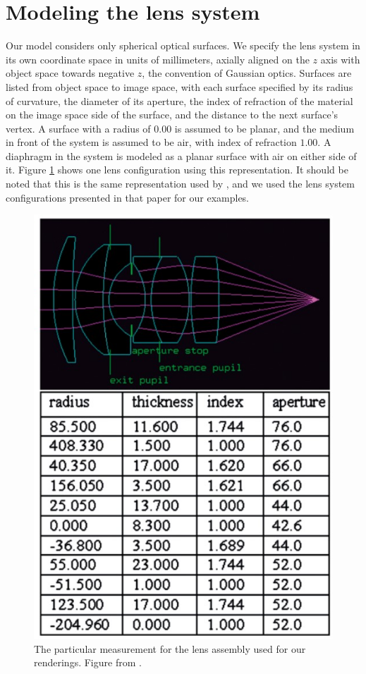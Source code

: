 \documentclass[twocolumn]{article}
\begin{document}
\section{Modeling the lens system}
Our model considers only spherical optical surfaces. We specify the lens system
in its own coordinate space in units of millimeters, axially aligned on the $z$
axis with object space towards negative $z$, the convention of Gaussian optics.
Surfaces are listed from object space to image space, with
each surface specified by its radius of curvature, the diameter of its
aperture, the index of refraction of the material on the image space side of
the surface, and the distance to the next surface's vertex. A surface with a
radius of $0.00$ is assumed to be planar, and the medium in front of the system
is assumed to be air, with index of refraction $1.00$. A diaphragm in the system
is modeled as a planar surface with air on either side of it. Figure \ref{fig:lens}
shows one lens configuration using this representation. It should be noted
that this is the same representation used by \cite{Wu2010}, and
we used the lens system configurations presented in that paper for our examples.

\begin{figure}[h]
    \centering
    \includegraphics[scale=0.4]{img/lens.jpg}
    \caption{The particular measurement for the lens assembly used for our
    renderings. Figure from \cite{Wu2010}.}
    \label{fig:lens}
\end{figure}
\end{document}
